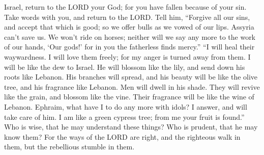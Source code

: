  Israel, return to the LORD your God; for you have fallen
because of your sin.  Take words with you, and return to
the LORD. Tell him, ``Forgive all our sins, and accept that which is
good; so we offer bulls as we vowed of our lips.  Assyria
can't save us. We won't ride on horses; neither will we say any more to
the work of our hands, `Our gods!' for in you the fatherless finds
mercy.''  ``I will heal their waywardness. I will love
them freely; for my anger is turned away from them.  I
will be like the dew to Israel. He will blossom like the lily, and send
down his roots like Lebanon.  His branches will spread,
and his beauty will be like the olive tree, and his fragrance like
Lebanon.  Men will dwell in his shade. They will revive
like the grain, and blossom like the vine. Their fragrance will be like
the wine of Lebanon.  Ephraim, what have I to do any more
with idols? I answer, and will take care of him. I am like a green
cypress tree; from me your fruit is found.''  Who is wise,
that he may understand these things? Who is prudent, that he may know
them? For the ways of the LORD are right, and the righteous walk in
them, but the rebellious stumble in them.
